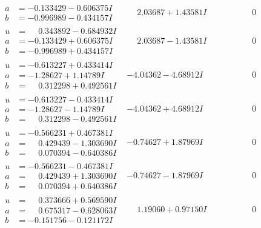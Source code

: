 \documentclass[1p]{elsarticle_modified}
\theoremstyle{definition}
\begin{document}
$$\begin{array}{c|c|c}
\begin{aligned}
a &= -0.133429 - 0.606375 I \\
b &= -0.996989 - 0.434157 I\end{aligned}
 & \phantom{-}2.03687 + 1.43581 I & \phantom{-0.000000 } 0 \\ \hline\begin{aligned}
u &= \phantom{-}0.343892 - 0.684932 I \\
a &= -0.133429 + 0.606375 I \\
b &= -0.996989 + 0.434157 I\end{aligned}
 & \phantom{-}2.03687 - 1.43581 I & \phantom{-0.000000 } 0 \\ \hline\begin{aligned}
u &= -0.613227 + 0.433414 I \\
a &= -1.28627 + 1.14789 I \\
b &= \phantom{-}0.312298 + 0.492561 I\end{aligned}
 & -4.04362 - 4.68912 I & \phantom{-0.000000 } 0 \\ \hline\begin{aligned}
u &= -0.613227 - 0.433414 I \\
a &= -1.28627 - 1.14789 I \\
b &= \phantom{-}0.312298 - 0.492561 I\end{aligned}
 & -4.04362 + 4.68912 I & \phantom{-0.000000 } 0 \\ \hline\begin{aligned}
u &= -0.566231 + 0.467381 I \\
a &= \phantom{-}0.429439 - 1.303690 I \\
b &= \phantom{-}0.070394 - 0.640386 I\end{aligned}
 & -0.74627 + 1.87969 I & \phantom{-0.000000 } 0 \\ \hline\begin{aligned}
u &= -0.566231 - 0.467381 I \\
a &= \phantom{-}0.429439 + 1.303690 I \\
b &= \phantom{-}0.070394 + 0.640386 I\end{aligned}
 & -0.74627 - 1.87969 I & \phantom{-0.000000 } 0 \\ \hline\begin{aligned}
u &= \phantom{-}0.373666 + 0.569590 I \\
a &= \phantom{-}0.675317 - 0.628063 I \\
b &= -0.151756 - 0.121172 I\end{aligned}
 & \phantom{-}1.19060 + 0.97150 I & \phantom{-0.000000 } 0 \\ \hline\begin{aligned}

\end{aligned}
\end{array}$$
\end{document}
